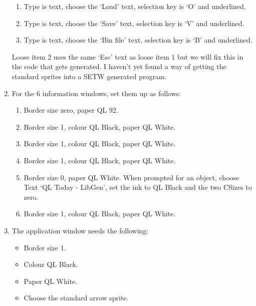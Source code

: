 \begin{enumerate}
{\begin{enumerate}[itemsep=0pt]
\item{}Type is text, choose the `Load' text, selection key is `O'
            and underlined.


\item{}Type is text, choose the `Save' text, selection key is `V'
            and underlined.


\item{}Type is text, choose the `Bin file' text, selection key is
            `B' and underlined.

\end{enumerate}

Loose item 2 uses the same `Esc' text as loose item 1 but we
        will fix this in the code that gets generated. I haven't yet found a
        way of getting the standard sprites into a
 SETW generated program.
}
\item{For the 6 information windows, set them up as follows:
\begin{enumerate}[itemsep=0pt]

\item{}Border size zero, paper QL 92.


\item{}Border size 1, colour QL Black, paper QL White.


\item{}Border size 1, colour QL Black, paper QL White.


\item{}Border size 1, colour QL Black, paper QL White.


\item{}Border size 0, paper QL White. When prompted for an object,
            choose Text `QL Today -{} LibGen', set the ink to QL Black and the
            two CSizes to zero.


\item{}Border size 1, colour QL Black, paper QL White.

\end{enumerate}
}
\item{The application window needs the following:
\begin{itemize}[itemsep=0pt]

\item{}Border size 1.


\item{}Colour QL Black.


\item{}Paper QL White.


\item{}Choose the standard arrow sprite.



\end{itemize}}
\end{enumerate}
